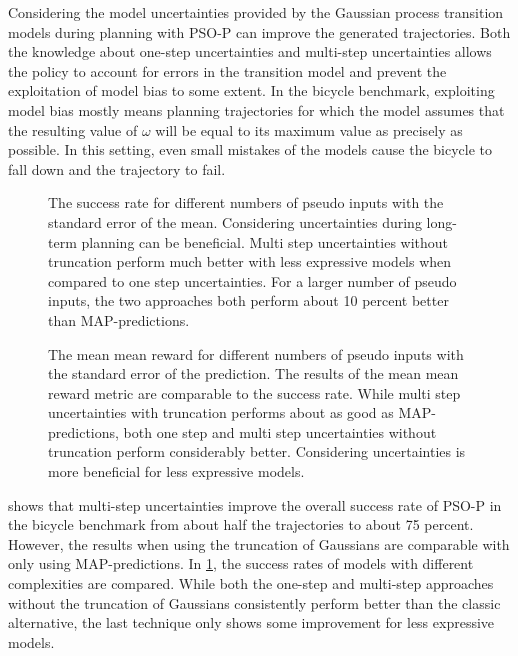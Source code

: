 Considering the model uncertainties provided by the Gaussian process transition models during planning with PSO-P can improve the generated trajectories.
Both the knowledge about one-step uncertainties and multi-step uncertainties allows the policy to account for errors in the transition model and prevent the exploitation of model bias to some extent.
In the bicycle benchmark, exploiting model bias mostly means planning trajectories for which the model assumes that the resulting value of $\omega$ will be equal to its maximum value as precisely as possible.
In this setting, even small mistakes of the models cause the bicycle to fall down and the trajectory to fail.

\begin{figure}[tp]
    \centering
    \caption[Success rates of all approaches] {
        The success rate for different numbers of pseudo inputs with the standard error of the mean.
        Considering uncertainties during long-term planning can be beneficial.
        Multi step uncertainties without truncation perform much better with less expressive models when compared to one step uncertainties.
        For a larger number of pseudo inputs, the two approaches both perform about 10 percent better than MAP-predictions.
    }
    \label{fig:results_goal_percentage}
\end{figure}
\begin{figure}[tp]
    \centering
    \caption[Mean mean rewards of all approaches]{
        The mean mean reward for different numbers of pseudo inputs with the standard error of the prediction.
        The results of the mean mean reward metric are comparable to the success rate.
        While multi step uncertainties with truncation performs about as good as MAP-predictions, both one step and multi step uncertainties without truncation perform considerably better.
        Considering uncertainties is more beneficial for less expressive models.
    }
    \label{fig:results_mean_mean_reward}
\end{figure}
 shows that multi-step uncertainties improve the overall success rate of PSO-P in the bicycle benchmark from about half the trajectories to about 75 percent.
However, the results when using the truncation of Gaussians are comparable with only using MAP-predictions.
In \cref{fig:results_goal_percentage}, the success rates of models with different complexities are compared.
While both the one-step and multi-step approaches without the truncation of Gaussians consistently perform better than the classic alternative, the last technique only shows some improvement for less expressive models.


